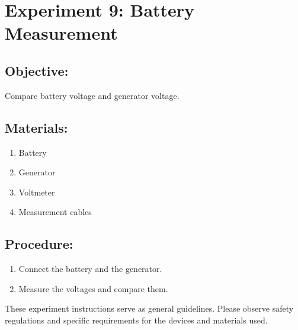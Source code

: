\documentclass[]{scrreprt}
\begin{document}
    \section*{Experiment 9: Battery Measurement}
    \subsection*{Objective:} Compare battery voltage and generator voltage.
    \subsection*{Materials:}
    \begin{enumerate}
        \item Battery
        \item Generator
        \item Voltmeter
        \item Measurement cables
    \end{enumerate}
    \subsection*{Procedure:}
    \begin{enumerate}
        \item Connect the battery and the generator.
        \item Measure the voltages and compare them.
    \end{enumerate}

    These experiment instructions serve as general guidelines. Please observe safety regulations and specific requirements for the devices and materials used.









\printglossaries
\end{document}
